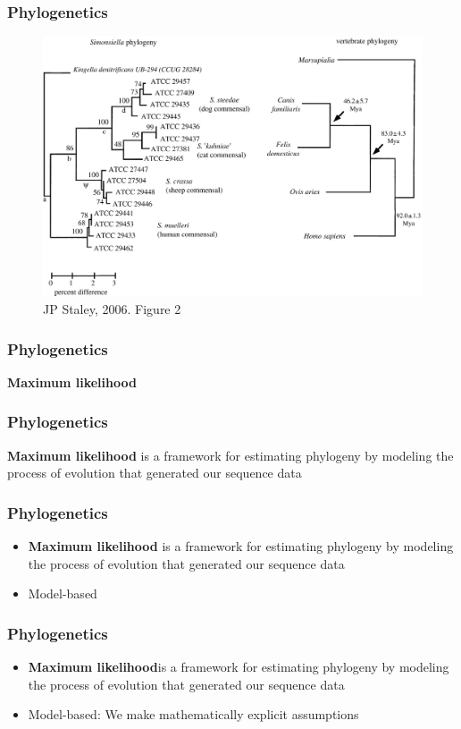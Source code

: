 \documentclass{beamer}
\begin{document}
\begin{frame}
\frametitle{Phylogenetics}
\begin{figure}
    \includegraphics[scale=0.25]{F2_large.jpg}
	\caption{JP Staley, 2006. Figure 2}
    \end{figure}
\end{frame}


\begin{frame}
\frametitle{Phylogenetics}
\textbf{Maximum likelihood}
\end{frame}
\begin{frame}
\frametitle{Phylogenetics}
\textbf{Maximum likelihood} is a framework for estimating phylogeny by modeling the process of evolution that generated our sequence data
\end{frame}

\begin{frame}
\frametitle{Phylogenetics}
\begin{itemize}
\item \textbf{Maximum likelihood} is a framework for estimating phylogeny by modeling the process of evolution that generated our sequence data
\item Model-based 
\end{itemize}
\end{frame} 

\begin{frame}
\frametitle{Phylogenetics}
\begin{itemize}
\item \textbf{Maximum likelihood}is a framework for estimating phylogeny by modeling the process of evolution that generated our sequence data
\item Model-based: We make mathematically explicit assumptions 
\end{itemize}
\end{frame} 
\end{document}
